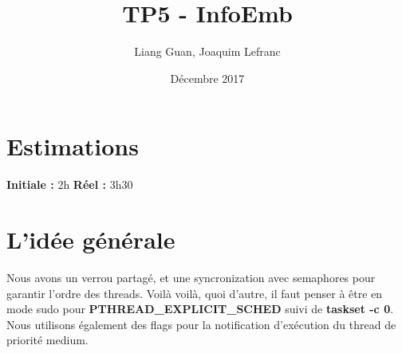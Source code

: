 \documentclass[12pt]{article}
\title{TP5 - InfoEmb}
\author{Liang Guan, Joaquim Lefranc}
\date{Décembre 2017}
\begin{document}
\maketitle

\section{Estimations}
\textbf{Initiale :} 2h
\textbf{Réel :} 3h30

\section{L'idée générale}
	Nous avons un verrou partagé, et une syncronization avec semaphores pour garantir l'ordre des threads. Voilà voilà,
	quoi d'autre, il faut penser à être en mode sudo pour \newline
	\textbf{PTHREAD\_EXPLICIT\_SCHED} suivi de \textbf{taskset -c 0}.
	Nous utilisons également des flags pour la notification d'exécution du thread de priorité medium.
\end{document}
